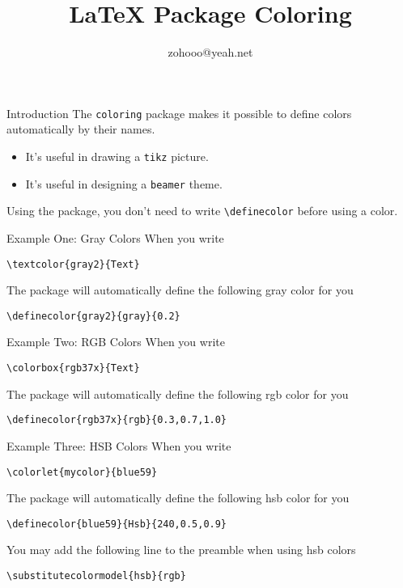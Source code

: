 \documentclass[14pt]{beamer}
\begin{document}
\title{LaTeX Package Coloring}
\author{zohooo@yeah.net}

\begin{frame}%
\transboxout
\titlepage
\end{frame}

\begin{frame}[fragile]{Introduction}
The \verb|coloring| package makes it possible to define colors automatically by their names.
\begin{itemize}
  \item It's useful in drawing a \verb|tikz| picture.
  \item It's useful in designing a \verb|beamer| theme.
\end{itemize}
Using the package, you \alert{don't} need to write \verb|\definecolor| before using a color.
\end{frame}

\begin{frame}[fragile]{Example One: Gray Colors}
When you write
\begin{lstlisting}
\textcolor{gray2}{Text}
\end{lstlisting}
The package will automatically define the following \alert{gray} color for you
\begin{lstlisting}
\definecolor{gray2}{gray}{0.2}
\end{lstlisting}
\end{frame}

\begin{frame}[fragile]{Example Two: RGB Colors}
When you write
\begin{lstlisting}
\colorbox{rgb37x}{Text}
\end{lstlisting}
The package will automatically define the following \alert{rgb} color for you
\begin{lstlisting}
\definecolor{rgb37x}{rgb}{0.3,0.7,1.0}
\end{lstlisting}
\end{frame}

\begin{frame}[fragile]{Example Three: HSB Colors}
When you write
\begin{lstlisting}
\colorlet{mycolor}{blue59}
\end{lstlisting}
The package will automatically define the following \alert{hsb} color for you
\begin{lstlisting}
\definecolor{blue59}{Hsb}{240,0.5,0.9}
\end{lstlisting}
You may add the following line to the preamble when using hsb colors
\begin{lstlisting}
\substitutecolormodel{hsb}{rgb}
\end{lstlisting}
\end{frame}
\end{document}
